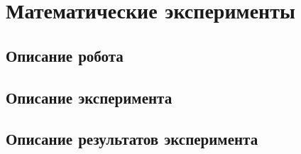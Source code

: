 \chapter{Математические эксперименты}\label{ch:ch4}

\section{Описание робота}\label{sec:ch4/sect1}

\section{Описание эксперимента}\label{sec:ch4/sect2}

\section{Описание результатов эксперимента}\label{sec:ch4/sect3}